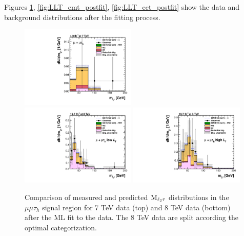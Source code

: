 Figures \ref{fig:LLT_mmt_postfit}, \ref{fig:LLT_emt_postfit}, \ref{fig:LLT_eet_postfit} show the data and background distributions after the fitting process.

\begin{figure}
\begin{center}
  \includegraphics[width=0.49\textwidth]{4_Analisys/pics/postfit/mmt_postfit_7TeV_FitAllChannels.pdf}\\
  \includegraphics[width=0.49\textwidth]{4_Analisys/pics/postfit/mmt_low_postfit_8TeV_FitAllChannels.pdf}
  \includegraphics[width=0.49\textwidth]{4_Analisys/pics/postfit/mmt_high_postfit_8TeV_FitAllChannels.pdf}\\
  \caption{Comparison of measured and predicted $\rm{M}_{\ell_2\tau}$ distributions in the $\mu\mu\tau_h$ signal region for 7 TeV data (top) and 8 TeV data (bottom) after the ML fit to the data. The 8 TeV data are split according the optimal categorization.}
  \label{fig:LLT_mmt_postfit}
\end{center}
\end{figure}

